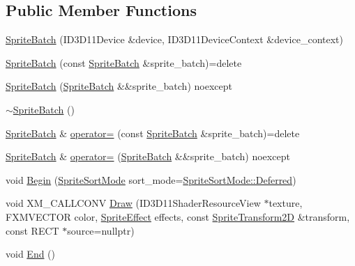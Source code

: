 \subsection*{Public Member Functions}
\begin{DoxyCompactItemize}
\item 
\mbox{\hyperlink{classmage_1_1rendering_1_1_sprite_batch_a44e4cca2560beccf655c87d79dca3d20}{Sprite\+Batch}} (I\+D3\+D11\+Device \&device, I\+D3\+D11\+Device\+Context \&device\+\_\+context)
\item 
\mbox{\hyperlink{classmage_1_1rendering_1_1_sprite_batch_a979cdc21ce17579ded4066f1e6a2d411}{Sprite\+Batch}} (const \mbox{\hyperlink{classmage_1_1rendering_1_1_sprite_batch}{Sprite\+Batch}} \&sprite\+\_\+batch)=delete
\item 
\mbox{\hyperlink{classmage_1_1rendering_1_1_sprite_batch_a91644c1c0c3e53a87f470116ec9746dc}{Sprite\+Batch}} (\mbox{\hyperlink{classmage_1_1rendering_1_1_sprite_batch}{Sprite\+Batch}} \&\&sprite\+\_\+batch) noexcept
\item 
\mbox{\hyperlink{classmage_1_1rendering_1_1_sprite_batch_aedb2831f0054cedb1ede8be8f27e0432}{$\sim$\+Sprite\+Batch}} ()
\item 
\mbox{\hyperlink{classmage_1_1rendering_1_1_sprite_batch}{Sprite\+Batch}} \& \mbox{\hyperlink{classmage_1_1rendering_1_1_sprite_batch_a336c16ed2eee2ef9fe8520903033f63e}{operator=}} (const \mbox{\hyperlink{classmage_1_1rendering_1_1_sprite_batch}{Sprite\+Batch}} \&sprite\+\_\+batch)=delete
\item 
\mbox{\hyperlink{classmage_1_1rendering_1_1_sprite_batch}{Sprite\+Batch}} \& \mbox{\hyperlink{classmage_1_1rendering_1_1_sprite_batch_ae5de43894a07d86a0d2e4150080a7990}{operator=}} (\mbox{\hyperlink{classmage_1_1rendering_1_1_sprite_batch}{Sprite\+Batch}} \&\&sprite\+\_\+batch) noexcept
\item 
void \mbox{\hyperlink{classmage_1_1rendering_1_1_sprite_batch_ae90ef53946738b7933ee69004dbbe63c}{Begin}} (\mbox{\hyperlink{namespacemage_1_1rendering_a4fad00dbca0c8d854c765ab831c76055}{Sprite\+Sort\+Mode}} sort\+\_\+mode=\mbox{\hyperlink{namespacemage_1_1rendering_aeb14ce7610cc9391f4e01be027b91dcca4ed71db54748b36eeb398876b0c747ac}{Sprite\+Sort\+Mode\+::\+Deferred}})
\item 
void X\+M\+\_\+\+C\+A\+L\+L\+C\+O\+NV \mbox{\hyperlink{classmage_1_1rendering_1_1_sprite_batch_a9308351a0f0f3199516ed34c880b61fd}{Draw}} (I\+D3\+D11\+Shader\+Resource\+View $\ast$texture, F\+X\+M\+V\+E\+C\+T\+OR color, \mbox{\hyperlink{namespacemage_1_1rendering_a4dbc3536c87b906f1d41d863ec458e78}{Sprite\+Effect}} effects, const \mbox{\hyperlink{classmage_1_1_sprite_transform2_d}{Sprite\+Transform2D}} \&transform, const R\+E\+CT $\ast$source=nullptr)
\item 
void \mbox{\hyperlink{classmage_1_1rendering_1_1_sprite_batch_ac27b9692f118361853c94af91b3d4d2d}{End}} ()
\end{DoxyCompactItemize}
